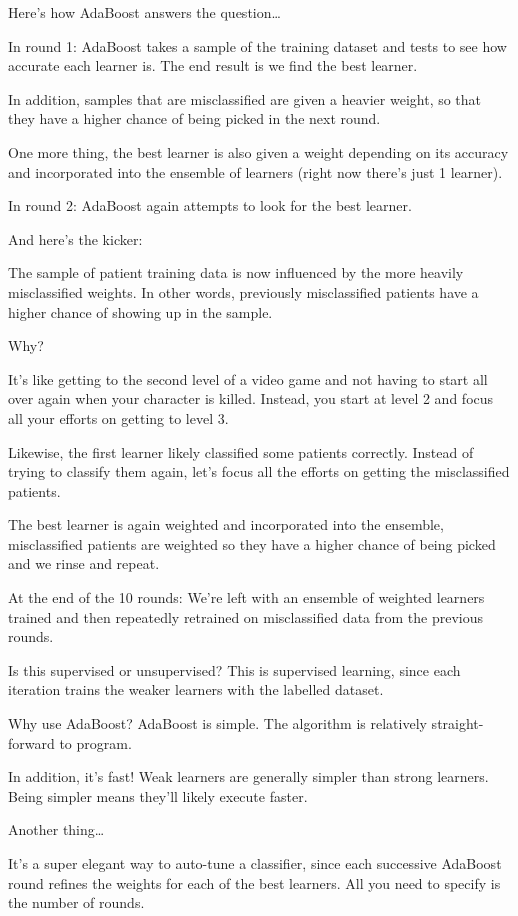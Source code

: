 Here’s how AdaBoost answers the question…

In round 1: AdaBoost takes a sample of the training dataset and tests to see how accurate each learner is. The end result is we find the best learner.

In addition, samples that are misclassified are given a heavier weight, so that they have a higher chance of being picked in the next round.

One more thing, the best learner is also given a weight depending on its accuracy and incorporated into the ensemble of learners (right now there’s just 1 learner).

In round 2: AdaBoost again attempts to look for the best learner.

And here’s the kicker:

The sample of patient training data is now influenced by the more heavily misclassified weights. In other words, previously misclassified patients have a higher chance of showing up in the sample.

Why?

It’s like getting to the second level of a video game and not having to start all over again when your character is killed. Instead, you start at level 2 and focus all your efforts on getting to level 3.

Likewise, the first learner likely classified some patients correctly. Instead of trying to classify them again, let’s focus all the efforts on getting the misclassified patients.

The best learner is again weighted and incorporated into the ensemble, misclassified patients are weighted so they have a higher chance of being picked and we rinse and repeat.

At the end of the 10 rounds: We’re left with an ensemble of weighted learners trained and then repeatedly retrained on misclassified data from the previous rounds.

Is this supervised or unsupervised? This is supervised learning, since each iteration trains the weaker learners with the labelled dataset.

Why use AdaBoost? AdaBoost is simple. The algorithm is relatively straight-forward to program.

In addition, it’s fast! Weak learners are generally simpler than strong learners. Being simpler means they’ll likely execute faster.

Another thing…

It’s a super elegant way to auto-tune a classifier, since each successive AdaBoost round refines the weights for each of the best learners. All you need to specify is the number of rounds.

